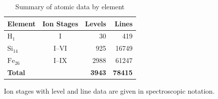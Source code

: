 \documentclass{article}
\begin{document}
\begin{table}[p]
\centering
\caption{Summary of atomic data by element\label{tab:atomdata-summary}}
\small
\renewcommand{\arraystretch}{1.12}
\begin{tabular*}{0.9\textwidth}{@{\extracolsep{\fill}}lcrr}
\hline
\textbf{Element} & \textbf{Ion Stages} & \textbf{Levels} & \textbf{Lines} \\
\hline
$\mathrm{H}_{1}$ & I & 30 & 419 \\
$\mathrm{Si}_{14}$ & I--VI & 925 & 16749 \\
$\mathrm{Fe}_{26}$ & I--IX & 2988 & 61247 \\
\textbf{Total} &  & \textbf{3943} & \textbf{78415} \\
\hline
\end{tabular*}

\medskip
\parbox{0.9\textwidth}{\footnotesize Ion stages with level and line data are given in spectroscopic notation.}
\end{table}
\end{document}
